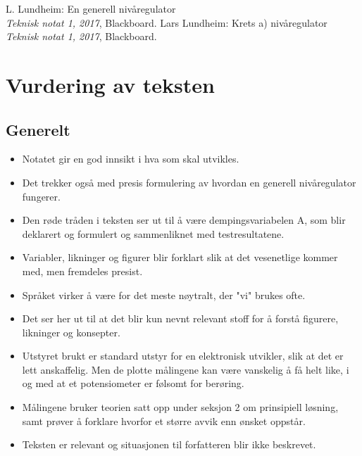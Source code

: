 \documentclass[a4paper,11pt,norsk]{article}
\begin{document}
\begin{thebibliography}{9}

L. Lundheim: En generell nivåregulator \\
\textit{Teknisk notat 1, 2017}, Blackboard.
Lars Lundheim: Krets a) nivåregulator \\
\textit{Teknisk notat 1, 2017}, Blackboard.
\end{thebibliography}

\section{Vurdering av teksten}
\subsection{Generelt}
\begin{itemize}
    \item Notatet gir en god innsikt i hva som skal utvikles.
    \item Det trekker også med presis formulering av hvordan en generell nivåregulator fungerer.
    \item Den røde tråden i teksten ser ut til å være dempingsvariabelen A, som blir deklarert og formulert og sammenliknet med testresultatene.
    \item Variabler, likninger og figurer blir forklart slik at det vesenetlige kommer med, men fremdeles presist.
    \item Språket virker å være for det meste nøytralt, der "vi" brukes ofte.
    \item Det ser her ut til at det blir kun nevnt relevant stoff for å forstå figurere, likninger og konsepter. 
    \item Utstyret brukt er standard utstyr for en elektronisk utvikler, slik at det er lett anskaffelig. Men de plotte målingene kan være vanskelig å få helt like, i og med at et potensiometer er følsomt for berøring.
    \item Målingene bruker teorien satt opp under seksjon 2 om prinsipiell løsning, samt prøver å forklare hvorfor et større avvik enn ønsket oppstår.
    \item Teksten er relevant og situasjonen til forfatteren blir ikke beskrevet.
\end{itemize}
\end{document}
